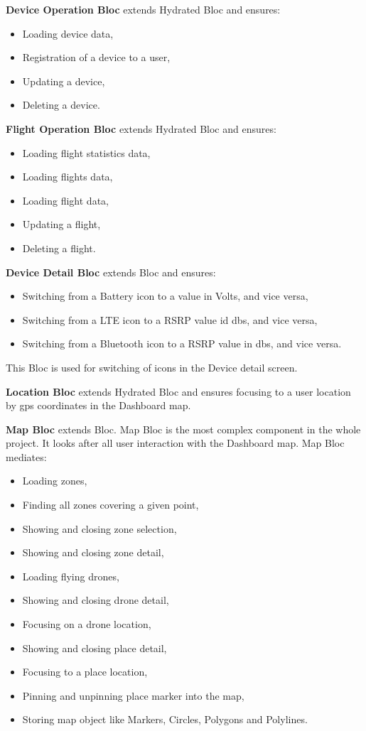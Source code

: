 \textbf{Device Operation Bloc} extends Hydrated Bloc and ensures:
\begin{itemize}
    \item Loading device data,
    \item Registration of a device to a user,
    \item Updating a device,
    \item Deleting a device.
\end{itemize}
\textbf{Flight Operation Bloc} extends Hydrated Bloc and ensures:
\begin{itemize}
    \item Loading flight statistics data,
    \item Loading flights data,
    \item Loading flight data,
    \item Updating a flight,
    \item Deleting a flight.
\end{itemize}
\textbf{Device Detail Bloc} extends Bloc and ensures:
\begin{itemize}
    \item Switching from a Battery icon to a value in Volts, and vice versa,
    \item Switching from a LTE icon to a RSRP value id \acrshort{db}s, and vice versa,
    \item Switching from a Bluetooth icon to a RSRP value in \acrshort{db}s, and vice versa.
\end{itemize}
This Bloc is used for switching of icons in the Device detail screen.

\textbf{Location Bloc} extends Hydrated Bloc and ensures focusing to a user location by \acrshort{gps} coordinates in the Dashboard map.

\textbf{Map Bloc} extends Bloc.
Map Bloc is the most complex component in the whole project.
It looks after all user interaction with the Dashboard map.
Map Bloc mediates:
\begin{itemize}
    \item Loading zones,
    \item Finding all zones covering a given point,
    \item Showing and closing zone selection,
    \item Showing and closing zone detail,
    \item Loading flying drones,
    \item Showing and closing drone detail,
    \item Focusing on a drone location,
    \item Showing and closing place detail,
    \item Focusing to a place location,
    \item Pinning and unpinning place marker into the map,
    \item Storing map object like Markers, Circles, Polygons and Polylines.
\end{itemize}

